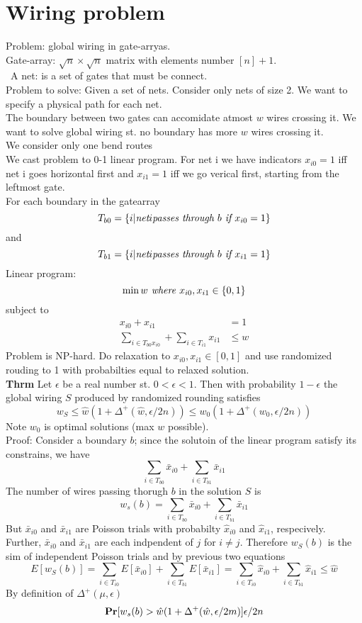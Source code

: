 \documentclass[a4paper]{article}
\def\Pr{\mbox{\textbf{Pr}}}
\begin{document}
\section{Wiring problem}
Problem: global wiring in gate-arryas.\\
Gate-array: \(\sqrt{n}\times\sqrt{n}\) matrix with elements number \([n]+1\).\\\
A net: is a set of gates that must be connect.\\
Problem to solve: Given a set of nets. Consider only nets of size 2. We want to specify a physical path for each net.\\
The boundary between two gates can accomidate atmost \(w\) wires crossing it. We want to solve global wiring st. no boundary has more \(w\) wires crossing it.\\
We consider only one bend routes\\
We cast problem to 0-1 linear program. For net i we have indicators \(x_{i0}=1\) iff net i goes horizontal first and \(x_{i1}=1\) iff we go verical first, starting from the leftmost gate.\\
For each boundary in the gatearray
\[T_{b0} = \{i | \emph{net} i \emph{passes through } b \emph{ if } x_{i0} = 1\}\]
and 
\[T_{b1} = \{i | \emph{net} i \emph{passes through } b \emph{ if } x_{i1} = 1\}\]
Linear program:
\[\min w \emph{ where }x_{i0},x_{i1} \in \{0,1\}\]
subject to
\begin{align}
x_{i0} + x_{i1} &= 1\\
\sum_{i \in T_{b0} x_{i0}} + \sum_{i \in T_{i1}} x_{i1} &\leq w
\end{align}
Problem is NP-hard. Do relaxation to \(x_{i0},x_{i1} \in [0,1]\) and use randomized rouding to 1 with probabilties equal to relaxed solution.\\
\textbf{Thrm} Let \(\epsilon\) be a real number st. \(0<\epsilon<1\). Then with probability \(1-\epsilon\) the global wiring \(S\) produced by randomized rounding satisfies
\[w_S \leq \hat{w}(1+\Delta^+(\hat{w},\epsilon/2n)) \leq w_0(1+\Delta^+(w_0,\epsilon/2n))\]
Note \(w_0\) is optimal solutions (max \(w\) possible).\\
Proof: Consider a boundary \(b\); since the solutoin of the linear program satisfy its constrains, we have
\[\sum_{i \in T_{b0}} \bar{x}_{i0} + \sum_{i\in T_{b1}} \bar{x}_{i1}\]
The number of wires passing thorugh \(b\) in the solution \(S\)  is
\[w_s(b) = \sum_{i \in T_{b0}} \bar{x}_{i0} + \sum_{i\in T_{b1}} \bar{x}_{i1}\]
 But \(\bar{x}_{i0}\) and \(\bar{x}_{i1}\) are Poisson trials with probabilty \(\hat{x}_{i0}\) and \(\hat{x}_{i1}\), respecively. Further, \(\bar{x}_{i0}\) and \(\bar{x}_{i1}\) are each indpendent of \(j\) for \(i\neq j\). Therefore \(w_S(b)\) is the sim of independent Poisson trials and by previous two equations
 \[E[w_S(b)] = \sum_{i \in T_{i0}} E[\bar{x}_{i0}] + \sum_{i\in T_{b1}} E[\bar{x}_{i1}] = \sum_{i \in T_{i0}} \hat{x}_{i0} + \sum_{i\in T_{b1}} \hat{x}_{i1} \leq \hat{w}\]
By definition of \(\Delta^+(\mu,\epsilon)\)
\[\Pr[w_s(b) > \hat{w}(1+\Delta^+(\hat{w},\epsilon/2m)] \epsilon/2n\]
\end{document}
